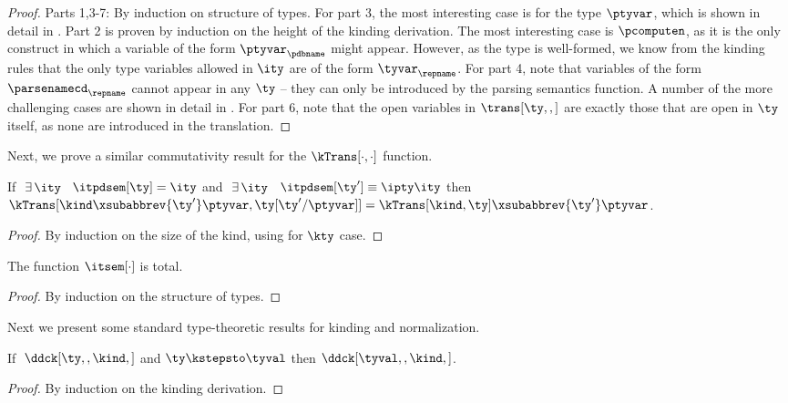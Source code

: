 \begin{proof}
  Parts 1,3-7: By induction on structure of types. For part 3, the
  most interesting case is for the type $\ptyvar$, which is shown in
  detail in .
  Part 2 is proven by induction
  on the height of the kinding derivation.  The most interesting case
  is $\pcomputen$, as it is the only construct in which a variable of
  the form $\ptyvar_\pdbname$ might appear. However, as the type is
  well-formed, we know from the kinding rules that the only type
  variables allowed in $\ity$ are of the form $\tyvar_\repname$.
  For part 4, note that variables of the form $\parsenamecd_\repname$
  cannot appear in any $\ty$ -- they can only be introduced by the
  parsing semantics function. A number of the more challenging cases
  are shown in detail in . 
  For part 6, note that the open variables in $\trans[\ty,,]$ are
  exactly those that are open in $\ty$ itself, as none are introduced
  in the translation.
\end{proof}

Next, we prove a similar commutativity result for the $\kTrans[\cdot,\cdot]$ function.
\begin{lemma}
 If $\ \exists\,\ity$ \suchthat\ $\itpdsem[\ty] = \ity$ and
    $\ \exists\,\ity$ \suchthat\ $\itpdsem[\ty'] \equiv {\ipty \ity}$
then  $\kTrans[{\kind\xsubabbrev {\ty'} \ptyvar},{\ty[\ty'/\ptyvar]}] = 
  \kTrans[\kind,\ty]\xsubabbrev {\ty'} \ptyvar$.
\label{lemma:pt-subst-comm}
\end{lemma}

\begin{proof}
  By induction on the size of the kind, using
   for $\kty$ case.
\end{proof}

\begin{lemma}
  The function $\itsem[\cdot]$ is total.
\end{lemma}
\begin{proof}
  By induction on the structure of types.
\end{proof}

Next we present some standard type-theoretic results for \ddc{}
kinding and normalization.

\begin{lemma}
  If $\; \ddck[\ty,,\kind,]$ and $\ty \kstepsto \tyval$ then $\ddck[\tyval,,\kind,]$.
\label{lemma:ddc-preservation}
\end{lemma}
\begin{proof}
  By induction on the kinding derivation.
\end{proof}

